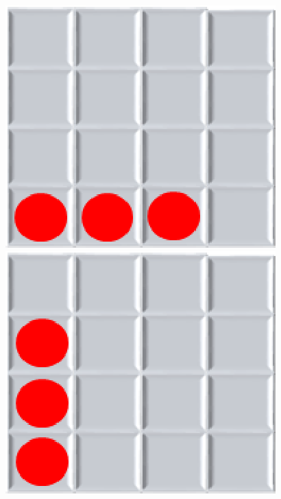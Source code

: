 \begin{figure}[h]
	\centering
	\begin{minipage}[t]{0.3\linewidth}
		\centering
		\includegraphics[scale=0.5]{contenido/cap4/imagenes/posibilidadesConecta3_01.eps}
	\end{minipage}
	\begin{minipage}[t]{0.3\linewidth}
		\centering
		\includegraphics[scale=0.5]{contenido/cap4/imagenes/posibilidadesConecta3_03.eps}
	\end{minipage}
	\begin{minipage}[t]{0.3\linewidth}
		\centering

\end{minipage}
\end{figure}
